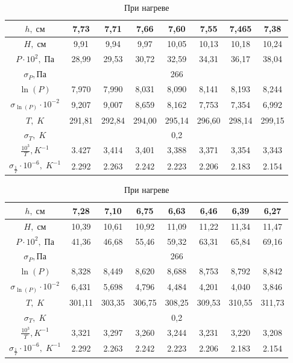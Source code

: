 \documentclass[a4paper, 12pt]{article} %
\begin{document}
\begin{center}
\begin{table}[h]
        \caption{При нагреве}
\begin{tabular}{|c|c|c|c|c|c|c|c|}
    \hline 
    $h ,\; {\text{см}}$  & 7,73 & 7,71 & 7,66 & 7,60 & 7,55 & 7,465 & 7,38 \\ 
    \hline 
    $H, \; \text{см}$ & 9,91  & 9,94  & 9,97 & 10,05 & 10,13 & 10,18 & 10,24  \\ 
    \hline 
    $P \cdot 10^2,\; \text{Па}$ & 28,99  & 29,53 & 30,72 & 32,59 & 34,31 & 36,17  & 38,04\\ 
    \hline 
    $\sigma_{P}, \text{Па}$  & \multicolumn{7}{|c|}{266}  \\
    \hline 
    $\ln(P)$  & 7,970 & 7,990 & 8,031 & 8,090 & 8,141 & 8,193 & 8,244 \\ 
    \hline 
    $\sigma_{\ln(P)} \cdot 10^{-2}$ & 9,207 & 9,007 & 8,659 & 8,162 & 7,753 & 7,354 & 6,992 \\ 
    \hline
    $T,\; K$ & 291,81 & 292,84 & 294,00 & 295,14 & 296,60 & 298,14 & 299,15 \\
    \hline
    $\sigma_{T},\; {K}$ &\multicolumn{7}{|c|}{0,2} \\
    \hline 
    $\frac{10^3}{T},{K}^{-1}$ & 3.427  & 3,414 & 3,401 & 3,388 & 3,371 & 3,354 & 3,343\\ 
    \hline
    $\sigma_{\frac{1}{T}} \cdot 10^{-6},\; {K}^{-1}$ & 2.292 & 2.263  & 2.242 & 2.223 &  2.206 & 2.183 & 2.154  \\
    \hline
\end{tabular}

\begin{tabular}{|c|c|c|c|c|c|c|c|}
    \hline 
    $h ,\; {\text{см}}$  & 7,28 & 7,10 & 6,75 & 6,63 & 6,46  & 6,39 & 6,27 \\ 
    \hline 
    $H, \; \text{см}$ & 10,39  & 10,61  & 10,92 & 11,09 & 11,22 & 11,34 & 11,47   \\ 
    \hline 
    $P \cdot 10^2,\; \text{Па}$ & 41,36  & 46,68 & 55,46 & 59,32 & 63,31 & 65,84  & 69,16\\ 
    \hline 
    $\sigma_{P}, \text{Па}$  & \multicolumn{7}{|c|}{266}  \\
    \hline 
    $\ln(P)$  & 8,328 & 8,449 & 8,620 & 8,688 & 8,753 & 8,792 & 8,842 \\ 
    \hline 
    $\sigma_{\ln(P)} \cdot 10^{-2}$ & 6,431 & 5,698 & 4,796 & 4,484 & 4,201 & 4,040 & 3,846 \\ 
    \hline
    $T,\; K$ & 301,11 & 303,35 & 306,75 & 308,25 & 309,53 & 310,55 & 311,73 \\
    \hline
    $\sigma_{T},\; {K}$ &\multicolumn{7}{|c|}{0,2} \\
    \hline 
    $\frac{10^3}{T},{K}^{-1}$ & 3,321 & 3,297 & 3,260 & 3,244 & 3,231 & 3,220 & 3,208\\ 
    \hline
    $\sigma_{\frac{1}{T}} \cdot 10^{-6},\; {K}^{-1}$ & 2.292 & 2.263  & 2.242 & 2.223 &  2.206 & 2.183 & 2.154  \\
    \hline
\end{tabular}


\end{table}
\end{center}
\end{document}
